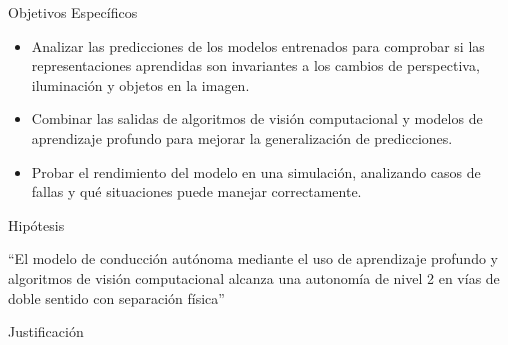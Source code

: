 \documentclass[10pt, usepdftitle=false]{beamer}
\begin{document}
\begin{frame}[fragile]{Objetivos Específicos}
	\begin{itemize}[<+-|alert@+>]
		\item Analizar las predicciones de los modelos entrenados para comprobar si las representaciones aprendidas son invariantes a los cambios de perspectiva, iluminación y objetos en la imagen.
		\item Combinar las salidas de algoritmos de visión computacional y modelos de aprendizaje profundo para mejorar la generalización de predicciones.
		\item Probar el rendimiento del modelo en una simulación, analizando casos de fallas y qué situaciones puede manejar correctamente.
	\end{itemize}
\end{frame}

\begin{frame}[fragile]{Hipótesis}
	\begin{center}
		\Large
		``El modelo de conducción autónoma mediante el uso de aprendizaje profundo y algoritmos de visión computacional alcanza una autonomía de nivel 2 en vías de doble sentido con separación física''
	\end{center}
\end{frame}

\begin{frame}[fragile]{Justificación}
	\begin{figure}[H]
		\captionsetup[subfloat]{labelformat=empty}
		\centering
	\end{figure}
\end{frame}
\end{document}
